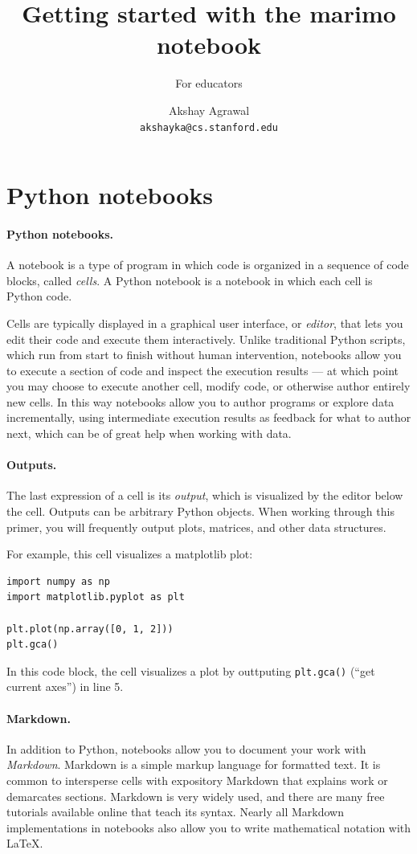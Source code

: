 \documentclass{article}
\title{Getting started with the marimo notebook}
\subtitle{For educators}
\author{Akshay Agrawal \\ \texttt{akshayka@cs.stanford.edu}}
\date{}
\begin{document}
\maketitle
\tableofcontents

\section{Python notebooks}

\paragraph{Python notebooks.} A notebook is a type of program in which code is
organized in a sequence of code blocks, called \emph{cells}.
A Python notebook is a notebook in which each cell is Python code.

Cells are typically displayed in a graphical user interface, or \emph{editor}, that
lets you edit their code and execute them interactively. Unlike traditional
Python scripts, which run from start to finish without human intervention,
notebooks allow you to execute a section of code and inspect the execution
results — at which point you may choose to execute another cell, modify 
code, or otherwise author entirely new cells. In this way notebooks allow you
to author programs or explore data incrementally, using intermediate execution
results as feedback for what to author next, which can be of great help when
working with data.

\paragraph{Outputs.} The last expression of a cell is its \emph{output}, which
is visualized by the editor below the cell. Outputs can be arbitrary Python
objects. When working through this primer, you will frequently output
plots, matrices, and other data structures.

For example, this cell visualizes a matplotlib plot:

\begin{lstlisting}
import numpy as np
import matplotlib.pyplot as plt

plt.plot(np.array([0, 1, 2]))
plt.gca()
\end{lstlisting}
In this code block, the cell visualizes a plot by outtputing \verb|plt.gca()|
(``get current axes'') in line 5.

\paragraph{Markdown.} In addition to Python, notebooks allow you to document
your work with \emph{Markdown}. Markdown is a simple markup language for
formatted text. It is common to intersperse cells with expository
Markdown that explains work or demarcates sections. Markdown is
very widely used, and there are many free tutorials available online that
teach its syntax. Nearly all Markdown implementations in notebooks also allow
you to write mathematical notation with \LaTeX.
\end{document}
